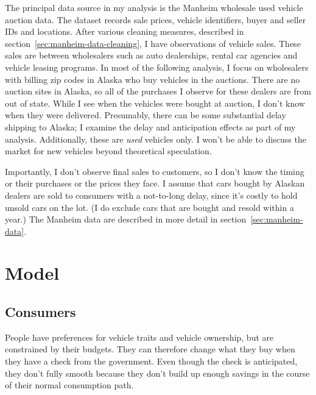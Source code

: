 \documentclass[11pt,letterpaper,oneside]{article}
\newcommand{\snippet}[1]{\hspace{-0.15em}}
\begin{document}
The principal data source in my analysis is the Manheim wholesale used vehicle auction data.
The dataset records sale prices, vehicle identifiers, buyer and seller IDs and locations.
After various cleaning measures, described in section~\ref{sec:manheim-data-cleaning}, I have
\snippet{auctions_cleaned_total_obs_count.tex}
observations of vehicle sales.
These sales are between wholesalers such as auto dealerships, rental car agencies and vehicle leasing programs.
In most of the following analysis, I focus on wholesalers with billing zip codes in Alaska who buy vehicles in the auctions.
There are no auction sites in Alaska, so all of the purchases I observe for these dealers are from out of state.
While I see when the vehicles were bought at auction, I don't know when they were delivered.
Presumably, there can be some substantial delay shipping to Alaska; I examine the delay and anticipation effects as part of my analysis.
Additionally, these are \emph{used} vehicles only.
I won't be able to discuss the market for new vehicles beyond theoretical speculation.


Importantly, I don't observe final sales to customers, so I don't know the timing or their purchases or the prices they face.
I assume that cars bought by Alaskan dealers are sold to consumers with a not-to-long delay, since it's costly to hold unsold cars on the lot.
(I do exclude cars that are bought and resold within a year.)
The Manheim data are described in more detail in section~\ref{sec:manheim-data}.



\section{Model}



\subsection{Consumers}


People have preferences for vehicle traits and vehicle ownership, but are constrained by their budgets.
They can therefore change what they buy when they have a check from the government.
Even though the check is anticipated, they don't fully smooth because they don't build up enough savings in the course of their normal consumption path.
\end{document}
